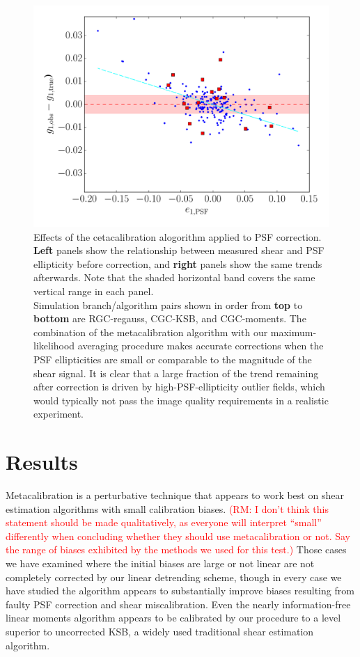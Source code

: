 \documentclass[iop]{emulateapj}
\newcommand\rmcomment[1]{\textcolor{red}{(RM: #1)}}
\begin{document}
\begin{figure}
\begin{center}
\includegraphics[width=0.4\linewidth]{./Plots/psf_e1-moments-opt-shear_plots.pdf}
\end{center}
\caption{Effects of the cetacalibration alogorithm applied to PSF
  correction. {\bf Left} panels show the relationship between measured
  shear and PSF ellipticity before correction, and {\bf right} panels
  show the same trends afterwards. Note that the shaded horizontal
  band covers the same vertical range in each panel.  \\
  Simulation branch/algorithm pairs shown in order from {\bf top} to
  {\bf bottom} are RGC-regauss, CGC-KSB, and CGC-moments. The
  combination of the metacalibration algorithm with our
  maximum-likelihood averaging procedure makes accurate corrections
  when the PSF ellipticities are small or comparable to the magnitude
  of the shear signal. It is clear that a large fraction of the trend
  remaining after correction is driven by high-PSF-ellipticity outlier
  fields, which would typically not pass the image quality
  requirements in a realistic experiment.}
\end{figure}


\section{Results}
Metacalibration is a perturbative technique that appears to work best
on shear estimation algorithms with small calibration biases. \rmcomment{I don't think this
  statement should be made qualitatively, as everyone will interpret ``small'' differently when
  concluding whether they should use metacalibration or not.  Say the range of biases exhibited by
  the methods we used for this test.} Those
cases we have examined where the initial biases are large or not
linear are not completely corrected by our linear detrending scheme,
though in every case we have studied the algorithm appears to
substantially improve biases resulting from faulty PSF correction and
shear miscalibration. Even the nearly information-free linear moments
algorithm appears to be calibrated by our procedure to a level
superior to uncorrected KSB, a widely used traditional shear estimation algorithm.
\end{document}
